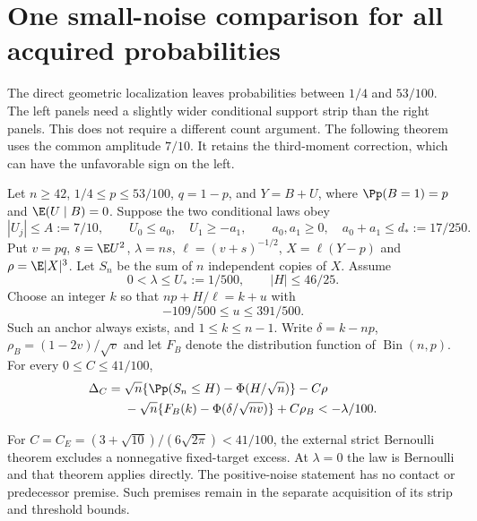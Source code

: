 \section{One small-noise comparison for all acquired probabilities}

The direct geometric localization leaves probabilities between $1/4$ and
$53/100$. The left panels need a slightly wider conditional support strip
than the right panels. This does not require a different count argument.
The following theorem uses the common amplitude $7/10$. It retains the
third-moment correction, which can have the unfavorable sign on the left.

\begin{theorem}\label{ap:main}
Let $n\ge42$, $1/4\le p\le53/100$, $q=1-p$, and $Y=B+U$, where
$\Pp(B=1)=p$ and $\E(U\mid B)=0$. Suppose the two conditional laws obey
\[
 |U_j|\le A:=7/10,\qquad U_0\le a_0,\quad U_1\ge-a_1,
 \qquad a_0,a_1\ge0,\quad a_0+a_1\le d_*:=17/250.
\]
Put $v=pq$, $s=\E U^2$, $\lambda=ns$, $\ell=(v+s)^{-1/2}$,
$X=\ell(Y-p)$ and $\rho=\E|X|^3$. Let $S_n$ be the sum of $n$
independent copies of $X$. Assume
\[
 0<\lambda\le U_*:=1/500,\qquad |H|\le46/25.
\]
Choose an integer $k$ so that $np+H/\ell=k+u$ with
\[
             -109/500\le u\le391/500.
\]
Such an anchor always exists, and $1\le k\le n-1$.
Write $\delta=k-np$, $\rho_B=(1-2v)/\sqrt v$ and let $F_B$ denote the
distribution function of $\operatorname{Bin}(n,p)$. For every $0\le C\le41/100$,
\begin{align*}
 \Delta_C={}&\sqrt n\{\Pp(S_n\le H)-\Phi(H/\sqrt n)\}-C\rho\\
 &-\sqrt n\{F_B(k)-\Phi(\delta/\sqrt{nv})\}+C\rho_B
                                                    <-\lambda/100.
\end{align*}
\end{theorem}

For $C=C_E=(3+\sqrt{10})/(6\sqrt{2\pi})<41/100$, the external strict
Bernoulli theorem excludes a nonnegative fixed-target excess. At $\lambda=0$
the law is Bernoulli and that theorem applies directly. The positive-noise
statement has no contact or predecessor premise. Such premises remain in
the separate acquisition of its strip and threshold bounds.

